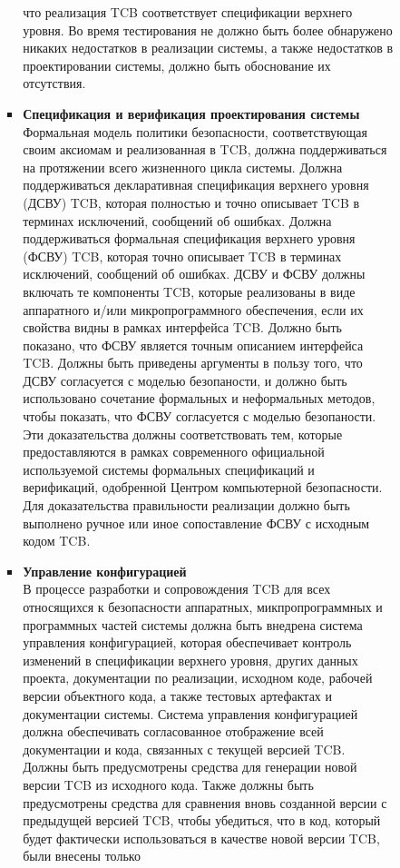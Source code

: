 \begin{enumerate}
\begin{enumerate}
\begin{enumerate}
\begin{itemize}
				что реализация TCB соответствует спецификации верхнего уровня. Во время тестирования не должно быть более обнаружено никаких недостатков в реализации системы, а также недостатков 
				в проектировании системы, должно быть обоснование их отсутствия.
				\item{\textbf{Спецификация и верификация проектирования системы}}\\
				Формальная модель политики безопасности, соответствующая своим аксиомам и реализованная в TCB, должна поддерживаться на протяжении всего жизненного цикла системы.
				Должна поддерживаться декларативная спецификация верхнего уровня (ДСВУ) TCB, которая полностью и точно описывает TCB в терминах исключений, сообщений об ошибках.
				Должна поддерживаться формальная спецификация верхнего уровня (ФСВУ) TCB, которая точно описывает	 TCB в терминах исключений, сообщений об ошибках.
				ДСВУ и ФСВУ должны включать те компоненты TCB, которые реализованы в виде аппаратного и/или микропрограммного обеспечения, если их свойства видны в рамках интерфейса TCB.
				Должно быть показано, что ФСВУ является точным описанием интерфейса TCB. Должны быть приведены аргументы в пользу того, что ДСВУ согласуется с моделью безопаности, 
				и должно быть использовано сочетание формальных и неформальных методов, чтобы показать, что ФСВУ согласуется с моделью безопаности.
				Эти доказательства должны соответствовать тем, которые предоставляются в рамках современного официальной используемой системы формальных спецификаций и верификаций, одобренной Центром компьютерной безопасности.
				Для доказательства правильности реализации должно быть выполнено ручное или иное сопоставление ФСВУ с исходным кодом TCB.
				\item{\textbf{Управление конфигурацией}}\\
				В процессе разработки и сопровождения TCB для всех относящихся к безопасности аппаратных, микпропрограммных и программных частей системы должна быть внедрена система управления
				конфигурацией, которая обеспечивает контроль изменений в спецификации верхнего уровня, других данных проекта, документации по реализации, исходном коде, рабочей версии 
				объектного кода, а также тестовых артефактах и документации системы. Система управления конфигурацией должна обеспечивать согласованное отображение всей документации и кода,
				связанных с текущей версией TCB. Должны быть предусмотрены средства для генерации новой версии TCB из исходного кода. Также должны быть предусмотрены средства для сравнения 
				вновь созданной версии с предыдущей версией TCB, чтобы убедиться, что в код, который будет фактически использоваться в качестве новой версии TCB, были внесены только 

\end{itemize}
\end{enumerate}
\end{enumerate}
\end{enumerate}
